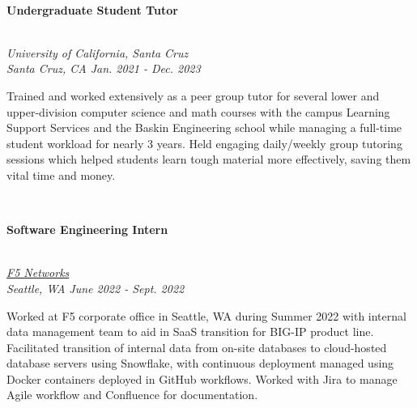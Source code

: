 \documentclass[letterpaper,10pt]{article}
\begin{document}
\begin{multicols*}{2}
\begin{minipage}{.5\textwidth}
\begin{flushleft}
    \end{flushleft}
  \end{minipage}
  \vspace{.5em} \\
  \begin{large} \textbf{Undergraduate Student Tutor} \end{large} \\
  \textit{University of California, Santa Cruz \\ Santa Cruz, CA \hfill Jan. 2021 - Dec. 2023}
  \vspace{5px} \\
  \begin{minipage}{.5\textwidth}
    \begin{flushleft}
      Trained and worked extensively as a peer group tutor for several lower and upper-division computer science and math courses with the campus Learning Support Services and the Baskin Engineering school while managing a full-time student workload for nearly 3 years. Held engaging daily/weekly group tutoring sessions which helped students learn tough material more effectively, saving them vital time and money.
    \end{flushleft}
  \end{minipage}
  \vspace{.5em} \\
  \begin{large} \textbf{Software Engineering Intern} \end{large} \\
  \textit{\href{https://www.f5.com/}{F5 Networks} \\ Seattle, WA \hfill June 2022 - Sept. 2022}
  \vspace{5px} \\
  \begin{minipage}{.5\textwidth}
    \begin{flushleft}
      Worked at F5 corporate office in Seattle, WA during Summer 2022 with internal data management team to aid in SaaS transition for BIG-IP product line. Facilitated transition of internal data from on-site databases to cloud-hosted database servers using Snowflake, with continuous deployment managed using Docker containers deployed in GitHub workflows. Worked with Jira to manage Agile workflow and Confluence for documentation.
    \end{flushleft}
  \end{minipage}
  \pagebreak
  \vspace{1em} \\

\end{multicols*}
\end{document}
